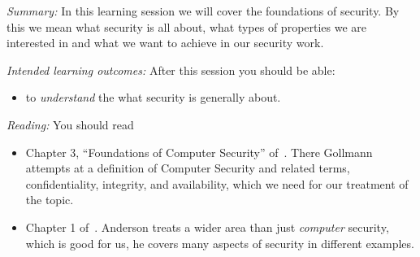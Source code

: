 \mode*


\emph{Summary:}
In this learning session we will cover the foundations of security.
By this we mean what security is all about, \eg what types of properties we are 
interested in and what we want to achieve in our security work.

\emph{Intended learning outcomes:}
After this session you should be able:
\begin{itemize}
  \item to \emph{understand} the what security is generally about.
\end{itemize}


\emph{Reading:}
You should read
\begin{itemize}
  \item Chapter 3, \enquote{Foundations of Computer Security} 
    of~\cite{Gollmann2011cs}.
    There Gollmann attempts at a definition of Computer Security and related 
    terms, \eg confidentiality, integrity, and availability, which we need for 
    our treatment of the topic.
  \item Chapter 1 of~\cite{Anderson2008sea}.
    Anderson treats a wider area than just \emph{computer} security, which is 
    good for us, he covers many aspects of security in different examples.
\end{itemize}
